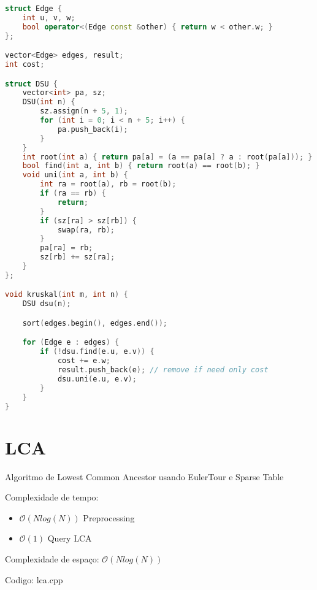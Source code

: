 \documentclass[10pt, a4paper, oneside]{book}
\begin{document}
\begin{lstlisting}[language=C++]
struct Edge {
    int u, v, w;
    bool operator<(Edge const &other) { return w < other.w; }
};

vector<Edge> edges, result;
int cost;

struct DSU {
    vector<int> pa, sz;
    DSU(int n) {
        sz.assign(n + 5, 1);
        for (int i = 0; i < n + 5; i++) {
            pa.push_back(i);
        }
    }
    int root(int a) { return pa[a] = (a == pa[a] ? a : root(pa[a])); }
    bool find(int a, int b) { return root(a) == root(b); }
    void uni(int a, int b) {
        int ra = root(a), rb = root(b);
        if (ra == rb) {
            return;
        }
        if (sz[ra] > sz[rb]) {
            swap(ra, rb);
        }
        pa[ra] = rb;
        sz[rb] += sz[ra];
    }
};

void kruskal(int m, int n) {
    DSU dsu(n);

    sort(edges.begin(), edges.end());

    for (Edge e : edges) {
        if (!dsu.find(e.u, e.v)) {
            cost += e.w;
            result.push_back(e); // remove if need only cost
            dsu.uni(e.u, e.v);
        }
    }
}
\end{lstlisting}
\hfill

\section{LCA}


Algoritmo de Lowest Common Ancestor usando EulerTour e Sparse Table



Complexidade de tempo:



\begin{itemize}
\item $\mathcal{O}(Nlog(N))$ Preprocessing
\item $\mathcal{O}(1)$ Query LCA
\end{itemize}



Complexidade de espaço: $\mathcal{O}(Nlog(N))$

\hfill

Codigo: lca.cpp
\end{document}
